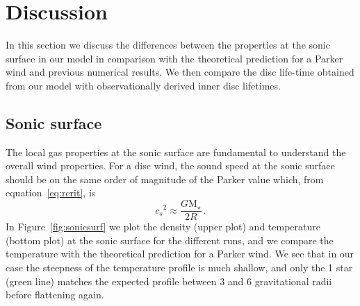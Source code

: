 \documentclass[usenatbib,useAMS,usedcolumn]{mnras}
\begin{document}
\section{Discussion}\label{sec:discussion}

In this section we discuss the differences between the properties at the sonic surface in our model in comparison with the theoretical prediction for a Parker wind and previous numerical results. We then compare the disc life-time obtained from our model with observationally derived inner disc lifetimes.

\subsection{Sonic surface}
The local gas properties at the sonic surface are fundamental to understand the overall wind properties.
For a disc wind, the sound speed at the sonic surface should be on the same order of magnitude of the Parker value which, from equation~\ref{eq:rcrit}, is
\begin{equation}
    {c_s}^2 \approx \frac{G \mathrm{M}_\star}{2R}\,.
\end{equation}
In Figure~\ref{fig:sonicsurf} we plot the density (upper plot) and temperature (bottom plot) at the sonic surface for the different runs, and we compare the temperature with the theoretical prediction for a Parker wind.
We see that in our case the steepness of the temperature profile is much shallow, and only the \SI{1}{\solarmass} star (green line) matches the expected profile between $3$ and $6$ gravitational radii before flattening again.
\end{document}
